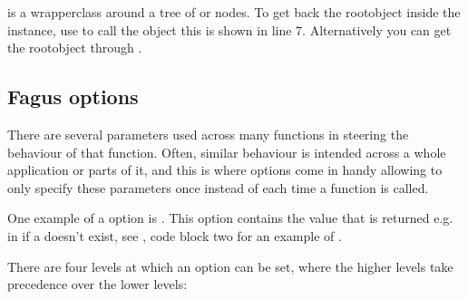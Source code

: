 \documentclass[a4paper,10pt,english]{sphinxmanual}
\begin{document}
\sphinxAtStartPar
{} is a wrapper\sphinxhyphen{}class around a tree of \sphinxhyphen{} or \sphinxhyphen{}nodes. To get back the root\sphinxhyphen{}object inside the instance, use \sphinxcode{\sphinxupquote{()}} to call the object \textendash{} this is shown in line 7. Alternatively you can get the root\sphinxhyphen{}object through .


\subsection{Fagus options}
\label{\detokenize{README:fagus-options}}
\sphinxAtStartPar
There are several parameters used across many functions in  steering the behaviour of that function. Often, similar behaviour is intended across a whole application or parts of it, and this is where options come in handy allowing to only specify these parameters once instead of each time a function is called.

\sphinxAtStartPar
One example of a \sphinxhyphen{}option is {\hyperref[\detokenize{README:default}]{}}. This option contains the value that is returned e.g. in {\hyperref[\detokenize{README:the-path-parameter}]{}} if a {\hyperref[\detokenize{README:the-path-parameter}]{}} doesn’t exist, see {\hyperref[\detokenize{README:introduction-what-it-solves}]{}}, code block two for an example of {\hyperref[\detokenize{README:default}]{}}.

\sphinxAtStartPar
There are four levels at which an option can be set, where the higher levels take precedence over the lower levels:
\end{document}
